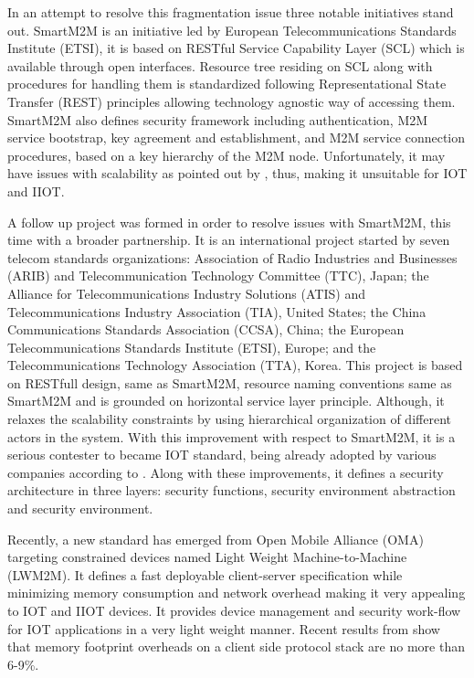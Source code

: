 In an attempt to resolve this fragmentation issue three notable initiatives stand out. SmartM2M is an initiative led by European Telecommunications Standards Institute (ETSI), it is based on RESTful Service Capability Layer (SCL) \cite{Alaya2014} which is available through open interfaces. Resource tree residing on SCL along with procedures for handling them is standardized following Representational State Transfer (REST) principles allowing technology agnostic way of accessing them. SmartM2M also defines security framework including  authentication, M2M service bootstrap, key agreement and establishment, and M2M service connection procedures, based on a key hierarchy of the M2M node\cite{ETSI1}. Unfortunately, it may have issues with scalability as pointed out by \cite{Grieco2014}, thus, making it unsuitable for IOT and IIOT. 

A follow up project was formed in order to resolve issues with SmartM2M, this time with a broader partnership. It is an international project started by seven telecom standards organizations: Association of Radio Industries and Businesses (ARIB) and Telecommunication Technology Committee (TTC), Japan; the Alliance for Telecommunications Industry Solutions (ATIS) and Telecommunications Industry Association (TIA), United States; the China Communications Standards Association (CCSA), China; the European Telecommunications Standards Institute (ETSI), Europe; and the Telecommunications Technology Association (TTA), Korea. This project is based on RESTfull design, same as SmartM2M, resource naming conventions same as SmartM2M and is grounded on horizontal service layer principle. Although, it relaxes the scalability constraints by using hierarchical organization of different actors in the system. With this improvement with respect to SmartM2M, it is a serious contester to became IOT standard, being already adopted by various companies according to \cite{Park2016}. Along with these improvements, it defines a security architecture in three layers: security functions, security environment abstraction and security environment.

Recently, a new standard has emerged from Open Mobile Alliance (OMA) targeting constrained devices named Light Weight Machine-to-Machine (LWM2M). It defines a fast deployable client-server specification while minimizing memory consumption and network overhead making it very appealing to IOT and IIOT devices. It provides device management and security work-flow for IOT applications in a very light weight manner. Recent results from \cite{Rao2015} show that memory footprint overheads on a client side protocol stack are no more than 6-9\%. 

